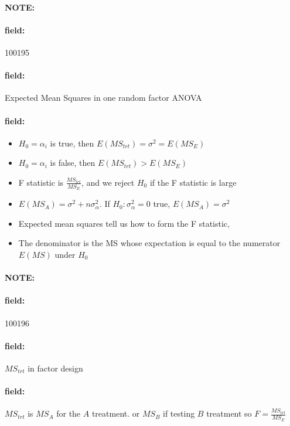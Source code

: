 \documentclass[12pt]{article}
\newenvironment{note}{\paragraph{NOTE:}}{}
\newenvironment{field}{\paragraph{field:}}{}
\begin{document}
\begin{note}
    \begin{field}
        \tiny 100195
    \end{field}
    \begin{field}
        Expected Mean Squares in one random factor ANOVA
    \end{field}
    \begin{field}
        \begin{itemize}
          \item $H_0 = \alpha_i$ is true, then $E(MS_{trt}) = \sigma^2 = E(MS_E)$
          \item $H_0 = \alpha_i$ is false, then $E(MS_{trt}) > E(MS_E)$
          \item F statistic is $\frac{MS_{trt}}{MS_E}$, and we reject $H_0$ if the F statistic is large
          \item $E(MS_A) = \sigma^2 + n\sigma_\alpha^2$. If $H_0: \sigma_\alpha^2 = 0$ true, $E(MS_A) = \sigma^2$
          \item Expected mean squares tell us how to form the F statistic,
          \item The denominator is the MS whose expectation is equal to the numerator $E(MS)$ under $H_0$
        \end{itemize}
    \end{field}
\end{note}

\begin{note}
    \begin{field}
        \tiny 100196
    \end{field}
    \begin{field}
        $MS_{trt}$ in factor design
    \end{field}
    \begin{field}
        $MS_{trt}$ is $MS_A$ for the $A$ treatment. or $MS_B$ if testing $B$ treatment so $F = \frac{MS_{trt}}{MS_E}$
    \end{field}
\end{note}
\end{document}

